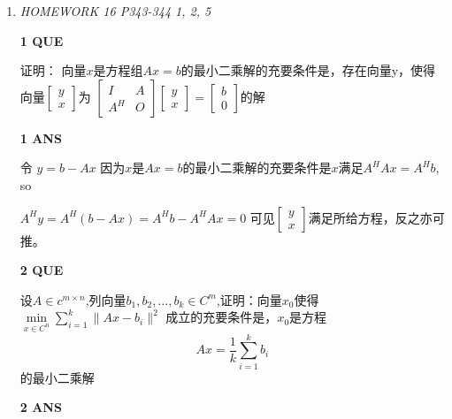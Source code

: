 \documentclass[11pt,letterpaper]{ctexart}
\begin{document}
\begin{enumerate}
\item \textit{HOMEWORK 16 {P343-344 1, 2, 5}}%


\textbf{1 QUE}
\bigskip

证明： 向量$x$是方程组$Ax = b$的最小二乘解的充要条件是，存在向量y，使得向量$\begin{bmatrix}
	y \\
	x
\end{bmatrix}$为 $\begin{bmatrix}
	I & A \\
	A^H & O
\end{bmatrix}\begin{bmatrix}
	y \\
	x
\end{bmatrix} = \begin{bmatrix}
	b \\
	0
\end{bmatrix}$的解

\textbf{1 ANS}
\bigskip

令 $y = b - Ax$ 因为$x$是$Ax = b$的最小二乘解的充要条件是$x$满足$A^HAx = A^Hb$, so 

$A^Hy = A^H(b - Ax) = A^{H}b - A^{H}Ax = 0$ 可见$\begin{bmatrix}
	y \\
	x
\end{bmatrix}$满足所给方程，反之亦可推。


\textbf{2 QUE}
\bigskip

设$A \in c_{}^{m \times n}$,列向量$b_1,b_2,\ldots,b_k \in C_{}^{m}$,证明：向量$x_0$使得
$\min\limits_{x \in C_{}^{n}}\displaystyle{\sum_{i = 1}^{k} \parallel Ax - b_i \parallel^2}$
成立的充要条件是，$x_0$是方程
\[ Ax = \frac{1}{k} \displaystyle{\sum_{i = 1}^{k}b_i}\]的最小二乘解

\textbf{2 ANS}
\bigskip


\end{enumerate}
\end{document}
